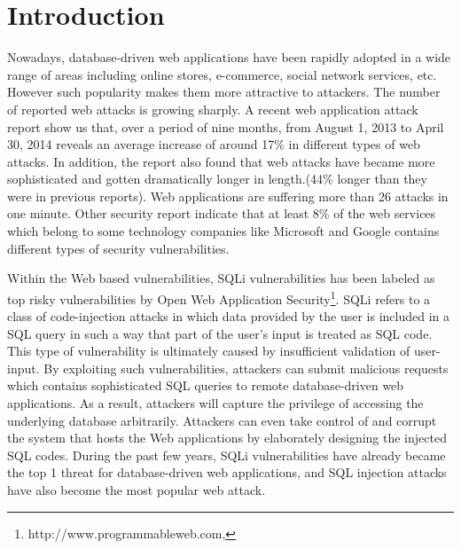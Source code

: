 \documentclass{sig-alternate}
\begin{document}

\section{Introduction}
Nowadays, database-driven web applications have been rapidly adopted in a wide range of areas including online stores, e-commerce, social network services, etc. However such popularity makes them more attractive to attackers. The number of reported web attacks is growing sharply\cite{web_security:report}. A recent web application attack report show us that, over a period of nine months, from August 1, 2013 to April 30, 2014 reveals an average increase of around 17\% in different types of web attacks. In addition, the report also found that web attacks have became more sophisticated and gotten dramatically longer in length.(44\% longer than they were in previous reports). Web applications are suffering more than 26 attacks in one minute\cite{web_security:report2}. Other security report indicate that at least 8\% of the web services which belong to some technology companies like Microsoft and Google contains different types of security vulnerabilities\cite{dsn09:scanner}.

Within the Web based vulnerabilities, SQLi vulnerabilities has been labeled as top risky vulnerabilities by {Open Web Application Security\footnote{http://www.programmableweb.com,}}. SQLi refers to a class of code-injection attacks in which data provided by the user is included in a SQL query in such a way that part of the user's input is treated as SQL code\cite{ase05:amneisa}. This type of vulnerability is ultimately caused by insufficient validation of user-input\cite{ase05:amneisa, halfond07:detection, halfond06:classification}. By exploiting such vulnerabilities, attackers can submit malicious requests which contains sophisticated SQL queries to remote database-driven web applications. As a result, attackers will capture the privilege of accessing the underlying database arbitrarily. Attackers can even take control of and corrupt the system that hosts the Web applications by elaborately designing the injected SQL codes. During the past few years, SQLi vulnerabilities have already became the top 1 threat for database-driven web applications, and SQL injection attacks have also become the most popular web attack. 
\end{document}
